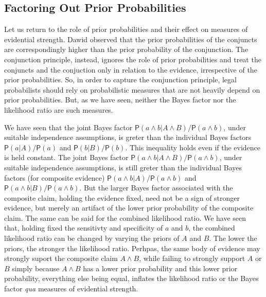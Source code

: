 \documentclass[
  10pt,
  dvipsnames,enabledeprecatedfontcommands]{scrartcl}
\newcommand{\pr}[1]{\mathsf{P}(#1)}
\begin{document}
\hypertarget{factoring-out-prior-probabilities}{%
\subsection{Factoring Out Prior
Probabilities}\label{factoring-out-prior-probabilities}}

Let us return to the role of prior probabilities and their effect on
measures of evidential strength. Dawid observed that the prior
probabilities of the conjuncts are correspondingly higher than the prior
probability of the conjunction. The conjunction principle, instead,
ignores the role of prior probabilities and treat the conjuncts and the
conjuction only in relation to the evidence, irrespective of the prior
probabilities. So, in order to capture the conjunction principle, legal
probabilists should rely on probabilistic measures that are not heavily
depend on prior probabilities. But, as we have seen, neither the Bayes
factor nor the likelihood ratio are such measures.

We have seen that the joint Bayes factor
\(\pr{a \wedge b\vert A\wedge B}/\pr{a \wedge b}\), under suitable
independence assumptions, is greter than the individual Bayes factors
\(\pr{a \vert A}/\pr{a}\) and \(\pr{b|B}/\pr{b}\). This inequality holds
even if the evidence is held constant. The joint Bayes factor
\(\pr{a \wedge b\vert A\wedge B}/\pr{a \wedge b}\), under suitable
independence assumptions, is still greter than the individual Bayes
factors (for composite evidence)
\(\pr{a \wedge b \vert A}/\pr{a\wedge b}\) and
\(\pr{a\wedge b|B}/\pr{a\wedge b}\). But the larger Bayes factor
associated with the composite claim, holding the evidence fixed, need
not be a sign of stronger evidence, but merely an artifact of the lower
prior probability of the composite claim. The same can be said for the
combined likelihood ratio. We have seen that, holding fixed the
sensitivty and specificity of \(a\) and \(b\), the combined likelihood
ratio can be changed by varying the priors of \(A\) and \(B\). The lower
the priors, the stronger the likelihood ratio. Perhpas, the same body of
evidence may strongly suport the composite claim \(A\wedge B\), while
failing to strongly support \(A\) or \(B\) simply because \(A\wedge B\)
has a lower prior probability and this lower prior probability,
everything else being equal, inflates the likelihood ratio or the Bayes
factor \textit{qua} measures of evidential strength.
\end{document}

